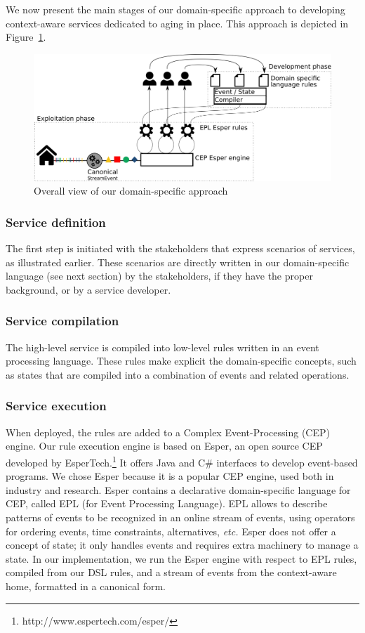 We now present the main stages of our domain-specific approach to developing context-aware services dedicated to aging in place. This approach is depicted in Figure~\ref{fig:functionalarchi}.

\begin{figure}[h]
\centering
  \includegraphics[scale=0.13]{gfx/approach}
\caption{Overall view of our domain-specific approach}
\label{fig:functionalarchi}
\end{figure}


\subsubsection{Service definition}
The first step is initiated with the stakeholders that express scenarios of services, as illustrated earlier. These scenarios are directly written in our domain-specific language (see next section) by the stakeholders, if they have the proper background, or by a service developer. 

\subsubsection{Service compilation}
The high-level service is compiled into low-level rules written in an event processing language. These rules make explicit the domain-specific concepts, such as states that are compiled into a combination of events and related operations.

\subsubsection{Service execution}
When deployed, the rules are added to a Complex Event-Processing (CEP) engine.  Our rule execution engine is based on Esper, an open source CEP developed by EsperTech.\footnote{http://www.espertech.com/esper/}  It offers Java and C\# interfaces to develop event-based programs.  We chose Esper because it is a popular CEP engine, used both in industry and research.  Esper contains a declarative domain-specific language for CEP, called EPL (for Event Processing Language).  EPL allows to describe patterns of events to be recognized in an online stream of events, using operators for ordering events, time constraints, alternatives, {\em etc.} Esper does not offer a concept of state; it only handles events and requires extra machinery to manage a state.  In our implementation, we run the Esper engine with respect to EPL rules, compiled from our DSL rules, and a stream of events from the context-aware home, formatted in a canonical form.

